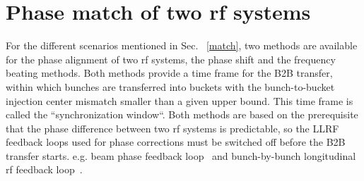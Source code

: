 
%

  
\section{Phase match of two rf systems}
\label{two_sync_methods}
For the different scenarios mentioned in Sec. ~\ref{match}, two methods are available for the phase alignment of two rf systems, the phase shift and the frequency beating methods. Both methods provide a time frame for the B2B transfer, within which bunches are transferred into buckets with the bunch-to-bucket injection center mismatch smaller than a given upper bound. This time frame is called the ``synchronization window``. Both methods are based on the prerequisite that the phase difference between two rf systems is predictable, so the LLRF feedback loops used for phase corrections must be switched off before the B2B transfer starts. e.g. beam phase feedback loop~\cite{grieser_beam_2015} and bunch-by-bunch longitudinal rf feedback loop~\cite{gross_bunch-by-bunch_2015}.


